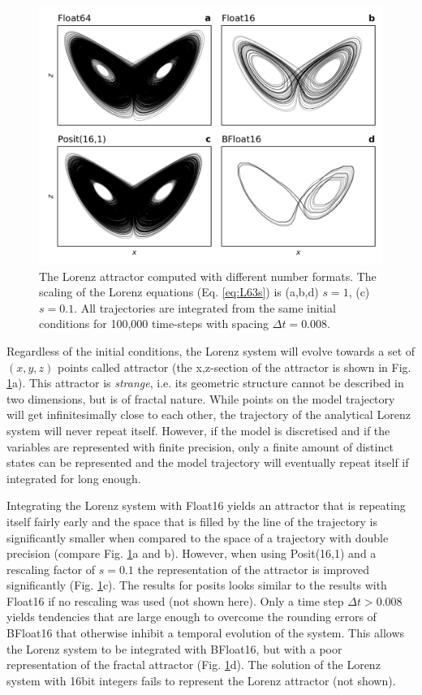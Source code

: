 \documentclass[draft]{agujournal2019}
\begin{document}
\begin{figure}
\includegraphics[width=1\textwidth]{../plots/lorenz_attractor.png}
\caption{The Lorenz attractor computed with different number formats. The scaling of the Lorenz equations (Eq. \ref{eq:L63s}) is (a,b,d) $s=1$, (c) $s=0.1$. All trajectories are integrated from the same initial conditions for 100,000 time-steps with spacing $\Delta t = 0.008$.}
\label{fig:L63}
\end{figure}

Regardless of the initial conditions, the Lorenz system will evolve towards a set of $(x,y,z)$ points called attractor (the x,z-section of the attractor is shown in Fig. \ref{fig:L63}a). This attractor is \emph{strange}, i.e. its geometric structure cannot be described in two dimensions, but is of fractal nature. 
While points on the model trajectory will get infinitesimally close to each other, the trajectory of the analytical Lorenz system will never repeat itself. However, if the model is discretised and if the variables are represented with finite precision, only a finite amount of distinct states can be represented and the model trajectory will eventually repeat itself if integrated for long enough. 

Integrating the Lorenz system with Float16 yields an attractor that is repeating itself fairly early and the space that is filled by the line of the trajectory is significantly smaller when compared to the space of a trajectory with double precision (compare Fig. \ref{fig:L63}a and b). However, when using Posit(16,1) and a rescaling factor of $s=0.1$ the representation of the attractor is improved significantly (Fig. \ref{fig:L63}c). The results for posits looks similar to the results with Float16 if no rescaling was used (not shown here). Only a time step $\Delta t > 0.008$ yields tendencies that are large enough to overcome the rounding errors of BFloat16 that otherwise inhibit a temporal evolution of the system. This  allows the Lorenz system to be integrated with BFloat16, but with a poor representation of the fractal attractor (Fig. \ref{fig:L63}d). The solution of the Lorenz system with 16bit integers fails to represent the Lorenz attractor (not shown).
\end{document}
